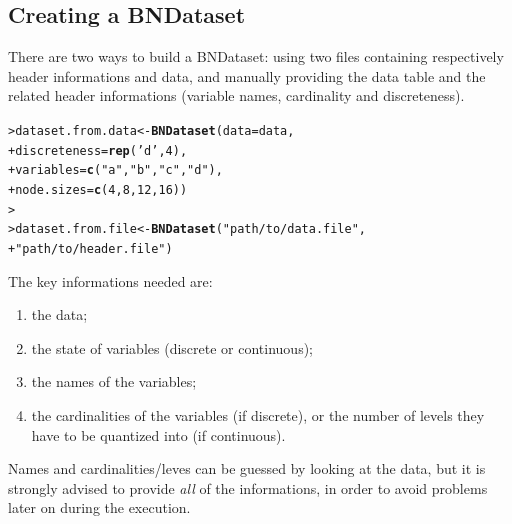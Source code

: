 \documentclass{article}\usepackage[]{graphicx}\usepackage[]{color}
\makeatletter
\newcommand{\hlnum}[1]{\textcolor[rgb]{0.686,0.059,0.569}{#1}}%
\newcommand{\hlstr}[1]{\textcolor[rgb]{0.192,0.494,0.8}{#1}}%
\newcommand{\hlstd}[1]{\textcolor[rgb]{0.345,0.345,0.345}{#1}}%
\newcommand{\hlkwb}[1]{\textcolor[rgb]{0.69,0.353,0.396}{#1}}%
\newcommand{\hlkwc}[1]{\textcolor[rgb]{0.333,0.667,0.333}{#1}}%
\newcommand{\hlkwd}[1]{\textcolor[rgb]{0.737,0.353,0.396}{\textbf{#1}}}%
\newenvironment{kframe}{%
 \def\at@end@of@kframe{}%
 \ifinner\ifhmode%
  \def\at@end@of@kframe{\end{minipage}}%
  \begin{minipage}{\columnwidth}%
 \fi\fi%
 \def\FrameCommand##1{\hskip\@totalleftmargin \hskip-\fboxsep
 \colorbox{shadecolor}{##1}\hskip-\fboxsep
     \hskip-\linewidth \hskip-\@totalleftmargin \hskip\columnwidth}%
 \MakeFramed {\advance\hsize-\width
   \@totalleftmargin\z@ \linewidth\hsize
   \@setminipage}}%
 {\par\unskip\endMakeFramed%
 \at@end@of@kframe}
\newenvironment{knitrout}{}{} %
\makeatother
\begin{document}
\subsection{Creating a BNDataset}
There are two ways to build a BNDataset: using two files containing respectively header informations
and data, and manually providing the data table and the related header informations
(variable names, cardinality and discreteness).

\begin{knitrout}
\color{fgcolor}\begin{kframe}
\begin{alltt}
\hlstd{> }\hlstd{dataset.from.data} \hlkwb{<-} \hlkwd{BNDataset}\hlstd{(}\hlkwc{data} \hlstd{= data,}
\hlstd{+ }                               \hlkwc{discreteness} \hlstd{=} \hlkwd{rep}\hlstd{(}\hlstr{'d'}\hlstd{,}\hlnum{4}\hlstd{),}
\hlstd{+ }                               \hlkwc{variables} \hlstd{=} \hlkwd{c}\hlstd{(}\hlstr{"a"}\hlstd{,} \hlstr{"b"}\hlstd{,} \hlstr{"c"}\hlstd{,} \hlstr{"d"}\hlstd{),}
\hlstd{+ }                               \hlkwc{node.sizes} \hlstd{=} \hlkwd{c}\hlstd{(}\hlnum{4}\hlstd{,}\hlnum{8}\hlstd{,}\hlnum{12}\hlstd{,}\hlnum{16}\hlstd{))}
\hlstd{> }
\hlstd{> }\hlstd{dataset.from.file} \hlkwb{<-} \hlkwd{BNDataset}\hlstd{(}\hlstr{"path/to/data.file"}\hlstd{,}
\hlstd{+ }                               \hlstr{"path/to/header.file"}\hlstd{)}
\end{alltt}
\end{kframe}
\end{knitrout}

The key informations needed are:
\begin{enumerate}
\item the data;
\item the state of variables (discrete or continuous);
\item the names of the variables;
\item the cardinalities of the variables (if discrete), or the number of levels they have to be quantized into
(if continuous). 
\end{enumerate}
Names and cardinalities/leves can be guessed by looking at the data, but it is strongly advised to provide
\textit{all} of the informations, in order to avoid problems later on during the execution.
\end{document}
